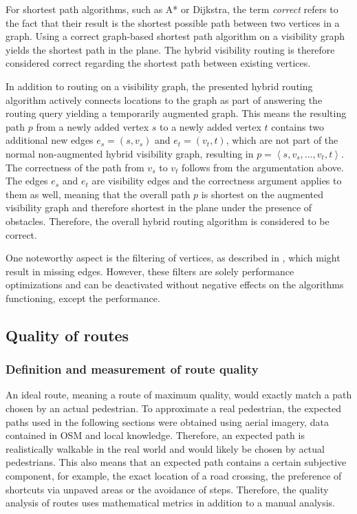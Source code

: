		For shortest path algorithms, such as A* or Dijkstra, the term \emph{correct} refers to the fact that their result is the shortest possible path between two vertices in a graph.
		Using a correct graph-based shortest path algorithm on a visibility graph yields the shortest path in the plane.
		The hybrid visibility routing is therefore considered correct regarding the shortest path between existing vertices.
		
		In addition to routing on a visibility graph, the presented hybrid routing algorithm actively connects locations to the graph as part of answering the routing query yielding a temporarily augmented graph.
		This means the resulting path $p$ from a newly added vertex $s$ to a newly added vertex $t$ contains two additional new edges $e_s=(s, v_s)$ and $e_t=(v_t, t)$, which are not part of the normal non-augmented hybrid visibility graph, resulting in $p=\left\langle s, v_s, ..., v_t, t \right\rangle$.
		The correctness of the path from $v_s$ to $v_t$ follows from the argumentation above.
		The edges $e_s$ and $e_t$ are visibility edges and the correctness argument applies to them as well, meaning that the overall path $p$ is shortest on the augmented visibility graph and therefore shortest in the plane under the presence of obstacles.
		Therefore, the overall hybrid routing algorithm is considered to be correct.
		
		One noteworthy aspect is the filtering of vertices, as described in , which might result in missing edges.
		However, these filters are solely performance optimizations and can be deactivated without negative effects on the algorithms functioning, except the performance.
		
	\subsection{Quality of routes}
	
		\subsubsection{Definition and measurement of route quality}
	
			An ideal route, meaning a route of maximum quality, would exactly match a path chosen by an actual pedestrian.
			To approximate a real pedestrian, the expected paths used in the following sections were obtained using aerial imagery, data contained in OSM and local knowledge.
			Therefore, an expected path is realistically walkable in the real world and would likely be chosen by actual pedestrians.
			This also means that an expected path contains a certain subjective component, for example, the exact location of a road crossing, the preference of shortcuts via unpaved areas or the avoidance of steps.
			Therefore, the quality analysis of routes uses mathematical metrics in addition to a manual analysis.
		
